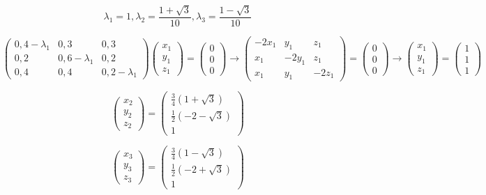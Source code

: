 \documentclass[a4paper,12pt]{article} %
\begin{document}
\begin{example}
$$
\lambda_{1}=1, \lambda_{2}=\frac{1+\sqrt{3}}{10}, \lambda_{3}=\frac{1-\sqrt{3}}{10}
$$



$$
\left(\begin{array}{ccc}
0,4-\lambda_{1} & 0,3 & 0,3 \\
0,2 & 0,6-\lambda_{1} & 0,2 \\
0,4 & 0,4 & 0,2-\lambda_{1}
\end{array}\right)\left(\begin{array}{l}
x_{1} \\
y_{1} \\
z_{1}
\end{array}\right)=\left(\begin{array}{l}
0 \\
0 \\
0
\end{array}\right) \rightarrow\left(\begin{array}{ccc}
-2 x_{1} & y_{1} & z_{1} \\
x_{1} & -2 y_{1} & z_{1} \\
x_{1} & y_{1} & -2 z_{1}
\end{array}\right)=\left(\begin{array}{l}
0 \\
0 \\
0
\end{array}\right) \rightarrow\left(\begin{array}{l}
x_{1} \\
y_{1} \\
z_{1}
\end{array}\right)=\left(\begin{array}{l}
1 \\
1 \\
1
\end{array}\right)
$$



$$
\left(\begin{array}{l}
x_{2} \\
y_{2} \\
z_{2}
\end{array}\right)=\left(\begin{array}{c}
\frac{3}{4}(1+\sqrt{3}) \\
\frac{1}{2}(-2-\sqrt{3}) \\
1
\end{array}\right)
$$

$$
\left(\begin{array}{l}
x_{3} \\
y_{3} \\
z_{3}
\end{array}\right)=\left(\begin{array}{c}
\frac{3}{4}(1-\sqrt{3}) \\
\frac{1}{2}(-2+\sqrt{3}) \\
1
\end{array}\right)
$$




\end{example}
\end{document}
